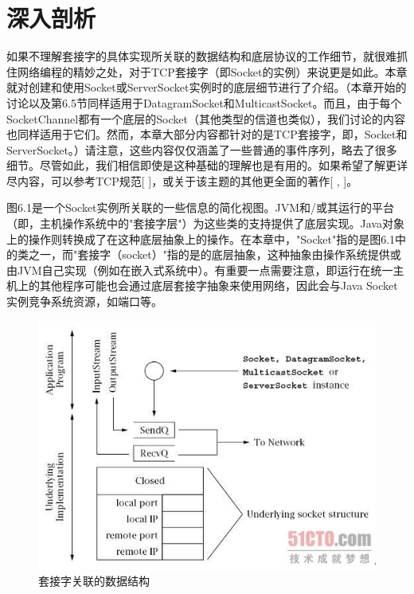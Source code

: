 \chapter{深入剖析} 

	如果不理解套接字的具体实现所关联的数据结构和底层协议的工作细节，就很难抓住网络编程的精妙之处，对于TCP套接字（即Socket的实例）来说更是如此。本章就对创建和使用Socket或ServerSocket实例时的底层细节进行了介绍。（本章开始的讨论以及第6.5节同样适用于DatagramSocket和MulticastSocket。而且，由于每个SocketChannel都有一个底层的Socket（其他类型的信道也类似），我们讨论的内容也同样适用于它们。然而，本章大部分内容都针对的是TCP套接字，即，Socket和ServerSocket。）请注意，这些内容仅仅涵盖了一些普通的事件序列，略去了很多细节。尽管如此，我们相信即使是这种基础的理解也是有用的。如果希望了解更详尽内容，可以参考TCP规范[ ]，或关于该主题的其他更全面的著作[ , ]。

	图6.1是一个Socket实例所关联的一些信息的简化视图。JVM和/或其运行的平台（即，主机操作系统中的"套接字层"）为这些类的支持提供了底层实现。Java对象上的操作则转换成了在这种底层抽象上的操作。在本章中，"Socket"指的是图6.1中的类之一，而"套接字（socket）"指的是的底层抽象，这种抽象由操作系统提供或由JVM自己实现（例如在嵌入式系统中）。有重要一点需要注意，即运行在统一主机上的其他程序可能也会通过底层套接字抽象来使用网络，因此会与Java Socket实例竞争系统资源，如端口等。

	\begin{figure}[htbp]%
		\centering
		\includegraphics[scale=.6]{img/06.01.jpg}
		\caption{套接字关联的数据结构}
		\label{fig:data.struct.of.socket}
	\end{figure}

